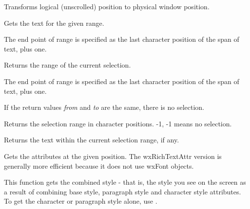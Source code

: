 Transforms logical (unscrolled) position to physical window position.

\label{wxrichtextctrlgetrange}


Gets the text for the given range.

The end point of range is specified as the last character position of the span of text, plus one.

\label{wxrichtextctrlgetselection}


Returns the range of the current selection.

The end point of range is specified as the last character position of the span of text, plus one.

If the return values {\it from} and {\it to} are the same, there is no selection.

\label{wxrichtextctrlgetselectionrange}


Returns the selection range in character positions. -1, -1 means no selection.

\label{wxrichtextctrlgetstringselection}


Returns the text within the current selection range, if any.

\label{wxrichtextctrlgetstyle}




Gets the attributes at the given position. The wxRichTextAttr version is generally more efficient
because it does not use wxFont objects.

This function gets the combined style - that is, the style you see on the screen as a result
of combining base style, paragraph style and character style attributes. To get the character
or paragraph style alone, use .

